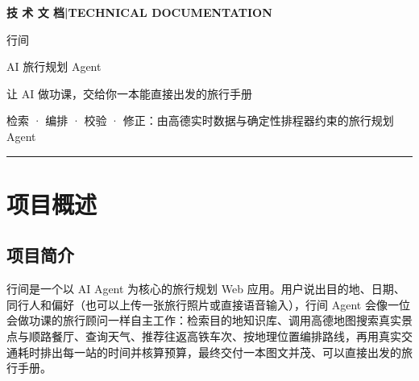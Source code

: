 \documentclass[a4paper]{article}
\begin{document}
\begin{titlepage}
\vspace*{11.25cm}
{\footnotesize\color{pine}\bfseries 技 术 文 档\quad\textcolor{line}{|}\quad\mdseries TECHNICAL DOCUMENTATION}\par
\vspace{0.55cm}
{\fontsize{52}{58}\selectfont\heavyfont 行间}\par
\vspace{0.25cm}
{\fontsize{22}{28}\selectfont\heavyfont AI 旅行规划 Agent}\par
\vspace{0.45cm}
{\large\color{inksoft}让 AI 做功课，交给你一本能直接出发的旅行手册}\par
\vspace{0.35cm}
{\small\color{inkfaint}检索 · 编排 · 校验 · 修正：由高德实时数据与确定性排程器约束的旅行规划 Agent}\par
\vfill
{\color{ink}\rule{\linewidth}{0.8pt}}\par\vspace{0.45cm}
\noindent{}\hfill
{}\par\vspace{0.4cm}
\noindent{}\hfill
{}\par\vspace{0.4cm}
\noindent{}\hfill
{}\par\vspace{0.4cm}
\noindent{}\par
\end{titlepage}

\pagestyle{empty}
{\linespread{1.08}\selectfont\tableofcontents}
\clearpage
\pagestyle{fancy}
\setcounter{page}{1}

\section{项目概述}

\subsection{项目简介}

行间是一个以 AI Agent 为核心的旅行规划 Web 应用。用户说出目的地、日期、同行人和偏好（也可以上传一张旅行照片或直接语音输入），行间 Agent
会像一位会做功课的旅行顾问一样自主工作：检索目的地知识库、调用高德地图搜索真实景点与顺路餐厅、查询天气、推荐往返高铁车次、按地理位置编排路线，再用真实交通耗时排出每一站的时间并核算预算，最终交付一本图文并茂、可以直接出发的旅行手册。
\end{document}
